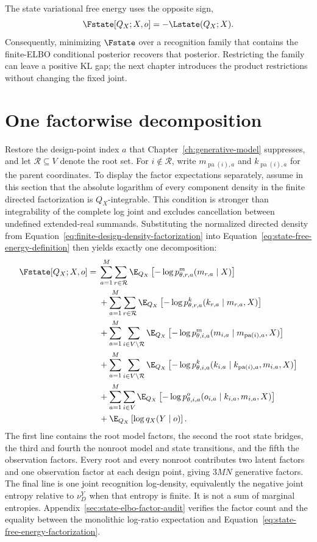 The state variational free energy uses the opposite sign,
\begin{equation}
\Fstate[Q_X;X,o]
=-\Lstate(Q_X;X).
\label{eq:state-free-energy-definition}
\end{equation}
Consequently, minimizing \(\Fstate\) over a recognition family that contains the finite-ELBO conditional posterior recovers that posterior. Restricting the family can leave a positive KL gap; the next chapter introduces the product restrictions without changing the fixed joint.

\section{One factorwise decomposition}

Restore the design-point index \(a\) that Chapter~\ref{ch:generative-model} suppresses, and let \(\mathcal R\subseteq V\) denote the root set. For \(i\notin\mathcal R\), write \(m_{\operatorname{pa}(i),a}\) and \(k_{\operatorname{pa}(i),a}\) for the parent coordinates. To display the factor expectations separately, assume in this section that the absolute logarithm of every component density in the finite directed factorization is \(Q_X\)-integrable. This condition is stronger than integrability of the complete log joint and excludes cancellation between undefined extended-real summands. Substituting the normalized directed density from Equation~\eqref{eq:finite-design-density-factorization} into Equation~\eqref{eq:state-free-energy-definition} then yields exactly one decomposition:
\begin{align}
\Fstate[Q_X;X,o]
={}&
\sum_{a=1}^{M}\sum_{r\in\mathcal R}
\E_{Q_X}\left[
-\log p_{\theta,r,a}^{m}(m_{r,a}\mid X)
\right]
\label{eq:state-free-energy-factorization}\\
&+\sum_{a=1}^{M}\sum_{r\in\mathcal R}
\E_{Q_X}\left[
-\log p_{\theta,r,a}^{k}(k_{r,a}\mid m_{r,a},X)
\right]\notag\\
&+\sum_{a=1}^{M}\sum_{i\in V\setminus\mathcal R}
\E_{Q_X}\left[
-\log p_{\theta,i,a}^{m}
(m_{i,a}\mid m_{\operatorname{pa}(i),a},X)
\right]\notag\\
&+\sum_{a=1}^{M}\sum_{i\in V\setminus\mathcal R}
\E_{Q_X}\left[
-\log p_{\theta,i,a}^{k}
(k_{i,a}\mid k_{\operatorname{pa}(i),a},m_{i,a},X)
\right]\notag\\
&+\sum_{a=1}^{M}\sum_{i\in V}
\E_{Q_X}\left[
-\log p_{\theta,i,a}^{o}(o_{i,a}\mid k_{i,a},m_{i,a},X)
\right]\notag\\
&+\E_{Q_X}\left[\log q_X(Y\mid o)\right].\notag
\end{align}
The first line contains the root model factors, the second the root state bridges, the third and fourth the nonroot model and state transitions, and the fifth the observation factors. Every root and every nonroot contributes two latent factors and one observation factor at each design point, giving \(3MN\) generative factors. The final line is one joint recognition log-density, equivalently the negative joint entropy relative to \(\nu_D^Y\) when that entropy is finite. It is not a sum of marginal entropies. Appendix~\ref{sec:state-elbo-factor-audit} verifies the factor count and the equality between the monolithic log-ratio expectation and Equation~\eqref{eq:state-free-energy-factorization}.

